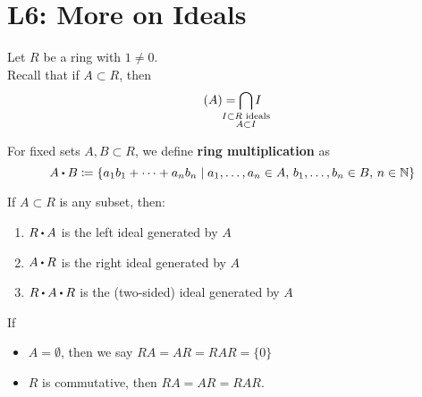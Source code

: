 \documentclass[../Main.tex]{subfiles}
\begin{document}
\chapter{L6: More on Ideals}
Let $R$ be a ring with $1\ne 0$.\\
Recall that if $A\subset R$, then
	\[(A)= \bigcap_{\mathclap{\substack{I \subset R \text{ ideals}\\A\subset I} } } I\]
\begin{dfn}[title= Ring Multiplication]
	For fixed sets $A,B \subset R$, we define \textbf{ring multiplication} as
	\[A\rdot B \coloneqq \{a_1b_1 + \dots + a_nb_n \mid a_1,\dots, a_n \in A,\, b_1, \dots, b_n \in B,\, n\in \N\}\]
\end{dfn}
\begin{prop}[title = Characterization of ideal generated by a set]
	If $A\subset R$ is any subset, then:
	\begin{enumerate}
		\item $R\rdot A$ is the left ideal generated by $A$
		\item $A\rdot R $ is the right ideal generated by $A$
		\item $R\rdot A\rdot R$ is the (two-sided) ideal generated by $A$
	\end{enumerate}
\Note If
\begin{itemize}
	\item $A=\emptyset$, then we say $RA=AR=RAR=\{0\}$
	\item $R$ is commutative, then $RA=AR=RAR$.
\end{itemize}
\end{prop}
\end{document}
